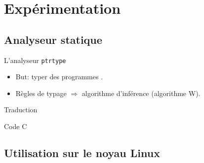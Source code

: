 \section{Expérimentation}

\subsection{Analyseur statique}

\begin{frame}{L'analyseur \texttt{ptrtype}}


\begin{itemize}
    \item But: typer des programmes \newspeak.
    \item Règles de typage $⇒$ algorithme d'inférence (algorithme W).
\end{itemize}
\end{frame}

\begin{frame}{Traduction}
\begin{block}{Code C}
\end{block}



\end{frame}

\subsection{Utilisation sur le noyau Linux}

